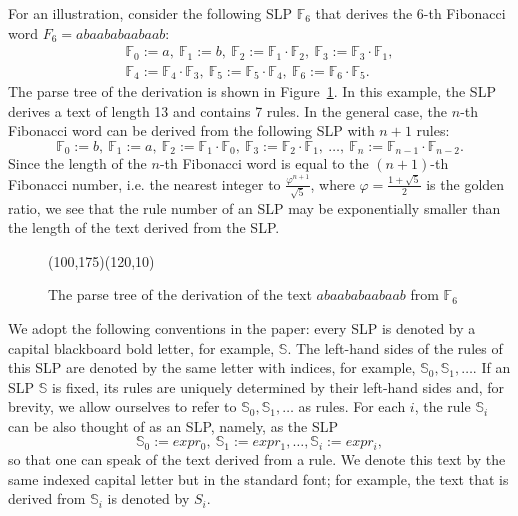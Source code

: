 \documentclass[11pt]{article}
\theoremstyle{break}
\newcommand{\slp}[1]{\mathbb{#1}}
\begin{document}
For an illustration, consider the following SLP $\slp{F}_6$ that derives the 6-th Fibonacci word $F_6=abaababaabaab$:
\begin{gather*}
\slp{F}_0 := a,\ \slp{F}_1 := b,\ \slp{F}_2 := \slp{F}_1\cdot \slp{F}_2,\ \slp{F}_3 := \slp{F}_3\cdot \slp{F}_1,\\
\slp{F}_4 := \slp{F}_4\cdot \slp{F}_3,\ \slp{F}_5 := \slp{F}_5\cdot \slp{F}_4,\ \slp{F}_6 := \slp{F}_6\cdot \slp{F}_5.
\end{gather*}
The parse tree of the derivation is shown in Figure~\ref{fibonacci_word_slp}. In this example, the SLP derives a text of length 13 and
contains 7 rules. In the general case, the $n$-th Fibonacci word can be derived from the following SLP with $n + 1$ rules:
$$\slp{F}_0:= b,\ \slp{F}_1:= a,\ \slp{F}_2:= \slp{F}_1\cdot\slp{F}_0,\ \slp{F}_3:= \slp{F}_2\cdot\slp{F}_1,\ \dots,\
\slp{F}_n:= \slp{F}_{n-1}\cdot\slp{F}_{n-2}.$$ Since the length of the $n$-th Fibonacci word is equal to the $(n + 1)$-th Fibonacci number,
i.e. the nearest integer to $\frac{\varphi^{n+1}}{\sqrt{5}}$, where $\varphi=\frac{1+\sqrt{5}}2$ is the golden ratio, we see that the rule
number of an SLP may be exponentially smaller than the length of the text derived from the SLP.

\begin{figure}[htb]
    \begin{center}
        \begin{picture}(100,175)(120,10)
            \fibonacciwordslp
        \end{picture}
    \end{center}
    \caption{The parse tree of the derivation of the text $abaababaabaab$ from $\slp{F}_6$}
    \label{fibonacci_word_slp}
\end{figure}

We adopt the following conventions in the paper: every SLP is denoted by a capital blackboard bold letter, for example, $\slp{S}$. The
left-hand sides of the rules of this SLP are denoted by the same letter with indices, for example, $\slp{S}_0,\slp{S}_1,\dots$. If an SLP
$\slp{S}$ is fixed, its rules are uniquely determined by their left-hand sides and, for brevity, we allow ourselves to refer to
$\slp{S}_0,\slp{S}_1,\dots$ as rules. For each $i$, the rule $\slp{S}_i$ can be also thought of as an SLP, namely, as the SLP
$$\slp{S}_0 := expr_0,\ \slp{S}_1 := expr_1, \dots, \slp{S}_i := expr_i,$$
so that one can speak of the text derived from a rule. We denote this text by the same indexed capital letter but in the standard font; for
example, the text that is derived from $\slp{S}_i$ is denoted by $S_i$.
\end{document}
